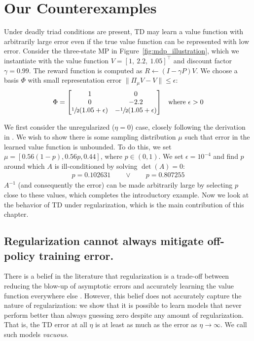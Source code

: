 \section{Our Counterexamples}\label{sec:introduce_example}
Under deadly triad conditions are present, TD may learn a value function with arbitrarily large error even if the true value function can be represented with low error.
Consider the three-state MP in Figure~\ref{fig:mdp_illustration}, which we instantiate with the value function $V = [1,~2.2,~1.05]^\top$ and discount factor $\gamma = 0.99$. The reward function is computed as $R \gets (I-\gamma P)V$. We choose a basis $\Phi$ with small representation error $\|\Pi_\mu V - V\| \leq \epsilon$:
\begin{align}
  \Phi & = \begin{bmatrix}
             1                              & 0                               \\
             0                              & -2.2                            \\
             \sfrac{1}{2} (1.05 + \epsilon) & -\sfrac{1}{2} (1.05 + \epsilon) \\
           \end{bmatrix} & \text{where $\epsilon > 0$}
\end{align}

We first consider the unregularized ($\eta=0$) case, closely following the derivation in \cite{kolter2011fixed}. We wish to show there is some sampling distribution $\mu$ such that error in the learned value function is unbounded. To do this, we set $\mu=[0.56(1-p), 0.56p, 0.44]$, where $p \in (0, 1)$. We set $\epsilon=10^{-4}$ and find $p$ around which $A$ is ill-conditioned by solving $\det(A) = 0$:
\begin{align}
  p = 0.102631 \qquad \lor \qquad p = 0.807255
\end{align}
$A^{-1}$ (and consequently the error) can be made arbitrarily large by selecting $p$ close to these values, which completes the introductory example. Now we look at the behavior of TD under regularization, which is the main contribution of this chapter.


\subsection{Regularization cannot always mitigate off-policy training error. }\label{sec:rrplotexplained}
There is a belief in the literature that regularization is a trade-off between reducing the blow-up of asymptotic errors and accurately learning the value function everywhere else \cite{diddigi2019convergent,zhang2021breaking}.
However, this belief does not accurately capture the nature of regularization: we show that it is possible to learn models that never perform better than always guessing zero despite any amount of regularization. That is, the TD error at all $\eta$ is at least as much as the error as $\eta\to\infty$. We call such models \emph{vacuous}.

